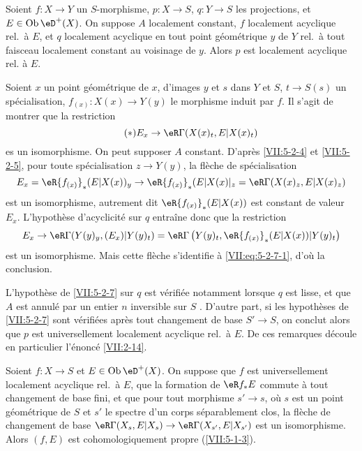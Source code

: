 \begin{corollary}\label{VII:5-2-7}
Soient $f:X\to Y$ un $S$-morphisme, $p:X\to S$, $q:Y\to S$ les projections, et 
$E\in\ob\eD^+(X)$. On suppose $A$ localement constant, $f$ localement acyclique 
rel.\ à $E$, et $q$ localement acyclique en tout point géométrique $y$ de 
$Y$ rel.\ à tout faisceau localement constant au voisinage de $y$. Alors $p$ 
est localement acyclique rel. à $E$. 
\end{corollary}

Soient $x$ un point géométrique de $x$, d'images $y$ et $s$ dans $Y$ et 
$S$, $t\to S(s)$ un spécialisation, $f_{(x)}:X(x)\to Y(y)$ le morphisme 
induit par $f$. Il s'agit de montrer que la restriction 
\begin{equation*}\tag{$*$}\label{VII:eq:5-2-7-1}
  E_x \to \eR\Gamma(X(x)_t,E|X(x)_t) 
\end{equation*}
es un isomorphisme. On peut supposer $A$ constant. D'après \ref{VII:5-2-4} et 
\ref{VII:5-2-5}, pour toute spécialisation $z\to Y(y)$, la flèche de 
spécialisation 
\[
  E_x = \eR {f_{(x)}}_\ast (E|X(x))_y \to \eR {f_{(x)}}_\ast (E|X(x)|_z = \eR\Gamma(X(x)_z,E|X(x)_z) 
\]
est un isomorphisme, autrement dit $\eR{f_{(x)}}_\ast(E|X(x))$ est constant de 
valeur $E_x$. L'hypothèse d'acyclicité sur $q$ entra\^ine donc que la 
restriction 
\[
  E_x \to \eR\Gamma(Y(y)_y,(E_x)|Y(y)_t) = \eR\Gamma\left(Y(y)_t,\eR {f_{(x)}}_\ast (E|X(x))|Y(y)_t\right)
\]
est un isomorphisme. Mais cette flèche s'identifie à 
\eqref{VII:eq:5-2-7-1}, d'où la conclusion. 

L'hypothèse de \ref{VII:5-2-7} sur $q$ est vérifiée notamment lorsque $q$ 
est lisse, et que $A$ est annulé par un entier $n$ inversible sur $S$ 
\cite[XV]{sga4}. D'autre part, si les hypothèses de \ref{VII:5-2-7} sont 
vérifiées après tout changement de base $S'\to S$, on conclut alors que 
$p$ est universellement localement acyclique rel.\ à $E$. De ces remarques 
découle en particulier l'énoncé \ref{VII:2-14}. 





\begin{corollary}\label{VII:5-2-8}
Soient $f:X\to S$ et $E\in \ob\eD^+(X)$. On suppose que $f$ est universellement 
localement acyclique rel.\ à $E$, que la formation de $\eR f_\ast E$ commute 
à tout changement de base fini, et que pour tout morphisme $s'\to s$, où 
$s$ est un point géométrique de $S$ et $s'$ le spectre d'un corps 
séparablement clos, la flèche de changement de base 
$\eR\Gamma(X_s,E|X_s)\to \eR\Gamma(X_{s'},E|X_{s'})$ est un isomorphisme. 
Alors $(f,E)$ est cohomologiquement propre (\ref{VII:5-1-3}). 
\end{corollary}

